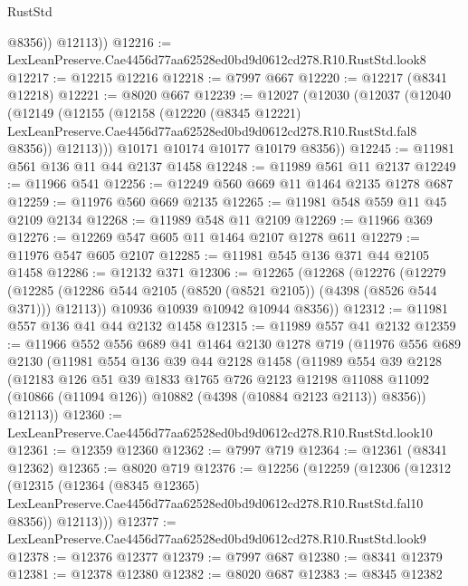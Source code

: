 \begin{lexlean}{RustStd}
\begin{coremodule}
            @8356))
        @12113))
@12216 := LexLeanPreserve.Cae4456d77aa62528ed0bd9d0612cd278.R10.RustStd.look8
@12217 := @12215 @12216
@12218 := @7997 @667
@12220 := @12217 (@8341 @12218)
@12221 := @8020 @667
@12239 := @12027
    (@12030
      (@12037
        (@12040
          (@12149
            (@12155
              (@12158
                (@12220
                  (@8345 @12221)
                  LexLeanPreserve.Cae4456d77aa62528ed0bd9d0612cd278.R10.RustStd.fal8
                  @8356))
              @12113)))
        @10171
        @10174
        @10177
        @10179
        @8356))
@12245 := @11981 @561 @136 @11 @44 @2137 @1458
@12248 := @11989 @561 @11 @2137
@12249 := @11966 @541
@12256 := @12249 @560 @669 @11 @1464 @2135 @1278 @687
@12259 := @11976 @560 @669 @2135
@12265 := @11981 @548 @559 @11 @45 @2109 @2134
@12268 := @11989 @548 @11 @2109
@12269 := @11966 @369
@12276 := @12269 @547 @605 @11 @1464 @2107 @1278 @611
@12279 := @11976 @547 @605 @2107
@12285 := @11981 @545 @136 @371 @44 @2105 @1458
@12286 := @12132 @371
@12306 := @12265
    (@12268
      (@12276
        (@12279 (@12285 (@12286 @544 @2105 (@8520 (@8521 @2105)) (@4398 (@8526 @544 @371))) @12113))
        @10936
        @10939
        @10942
        @10944
        @8356))
@12312 := @11981 @557 @136 @41 @44 @2132 @1458
@12315 := @11989 @557 @41 @2132
@12359 := @11966
    @552
    @556
    @689
    @41
    @1464
    @2130
    @1278
    @719
    (@11976
      @556
      @689
      @2130
      (@11981
        @554
        @136
        @39
        @44
        @2128
        @1458
        (@11989
          @554
          @39
          @2128
          (@12183
            @126
            @51
            @39
            @1833
            @1765
            @726
            @2123
            @12198
            @11088
            @11092
            (@10866 (@11094 @126))
            @10882
            (@4398 (@10884 @2123 @2113))
            @8356))
        @12113))
@12360 := LexLeanPreserve.Cae4456d77aa62528ed0bd9d0612cd278.R10.RustStd.look10
@12361 := @12359 @12360
@12362 := @7997 @719
@12364 := @12361 (@8341 @12362)
@12365 := @8020 @719
@12376 := @12256
    (@12259
      (@12306
        (@12312
          (@12315
            (@12364
              (@8345 @12365)
              LexLeanPreserve.Cae4456d77aa62528ed0bd9d0612cd278.R10.RustStd.fal10
              @8356))
          @12113)))
@12377 := LexLeanPreserve.Cae4456d77aa62528ed0bd9d0612cd278.R10.RustStd.look9
@12378 := @12376 @12377
@12379 := @7997 @687
@12380 := @8341 @12379
@12381 := @12378 @12380
@12382 := @8020 @687
@12383 := @8345 @12382

\end{coremodule}
\end{lexlean}

